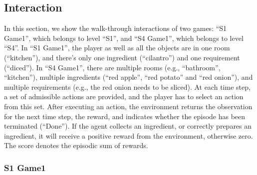 \documentclass[11pt]{article}
\begin{document}
\clearpage
\subsection{Interaction \label{app_app_interaction}}

In this section, we show the walk-through interactions of two games: ``S1 Game1'', which belongs to level ``S1'', and ``S4 Game1'', which belongs to level ``S4''. 
In ``S1 Game1'', the player as well as all the objects are in one room  (``kitchen''), and there's only one ingredient (``cilantro'') and one requirement (``diced'').
In ``S4 Game1'', there are multiple rooms (e.g., ``bathroom'', ``kitchen''), multiple ingredients (``red apple'', ``red potato'' and ``red onion''), and multiple requirements (e.g., the red onion needs to be sliced). 
At each time step, a set of admissible actions are provided, and the player has to select an action from this set. 
After executing an action, the environment returns the observation for the next time step, the reward, and indicates whether the episode has been terminated (``Done''). 
If the agent collects an ingredient, or correctly prepares an ingredient, it will receive a positive reward from the environment, otherwise zero.
The score denotes the episodic sum of rewards. 

\subsubsection{S1 Game1}
\end{document}
